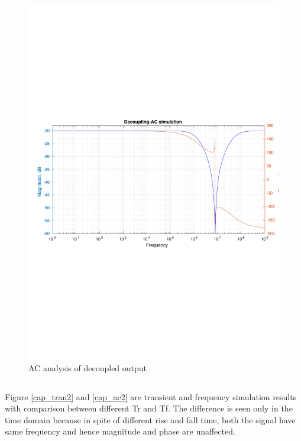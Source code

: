 \documentclass[12pt,a4paper,UKenglish]{article}
\begin{document}
\begin{figure} [H]
  \centering 
  \includegraphics[width=\textwidth]{img/3e_ac.pdf} 
  \caption{AC analysis of decoupled output}
  \label{cap_ac} 
\end{figure}

\subsection{}
Figure  \ref{cap_tran2} and  \ref{cap_ac2}  are transient and frequency simulation results with comparison between different Tr and Tf. The difference is seen only in the time domain because in spite of different rise and fall time, both the signal have same frequency and hence magnitude and phase are unaffected. 
\end{document}
